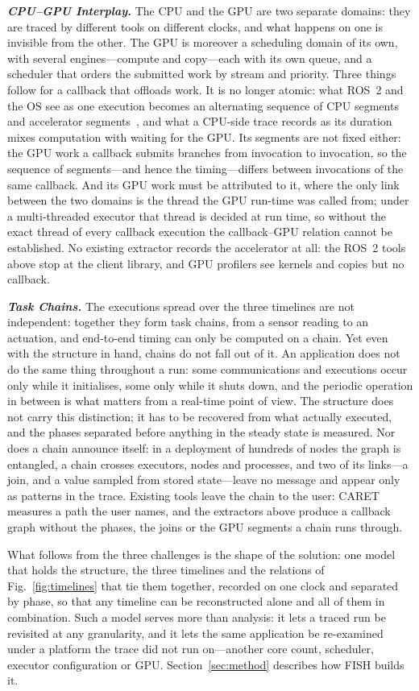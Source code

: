 \noindent
\textit{\textbf{CPU--GPU Interplay.}}
The CPU and the GPU are two separate domains: they are traced by different tools on different clocks, and what happens on one is invisible from the other. The GPU is moreover a scheduling domain of its own, with several engines---compute and copy---each with its own queue, and a scheduler that orders the submitted work by stream and priority. Three things follow for a callback that offloads work. It is no longer atomic: what ROS~2 and the OS see as one execution becomes an alternating sequence of CPU segments and accelerator segments~\cite{enright-2024-paam}, and what a CPU-side trace records as its duration mixes computation with waiting for the GPU. Its segments are not fixed either: the GPU work a callback submits branches from invocation to invocation, so the sequence of segments---and hence the timing---differs between invocations of the same callback. And its GPU work must be attributed to it, where the only link between the two domains is the thread the GPU run-time was called from; under a multi-threaded executor that thread is decided at run time, so without the exact thread of every callback execution the callback--GPU relation cannot be established. No existing extractor records the accelerator at all: the ROS~2 tools above stop at the client library, and GPU profilers see kernels and copies but no callback.

\noindent
\textit{\textbf{Task Chains.}}
The executions spread over the three timelines are not independent: together they form task chains, from a sensor reading to an actuation, and end-to-end timing can only be computed on a chain. Yet even with the structure in hand, chains do not fall out of it. An application does not do the same thing throughout a run: some communications and executions occur only while it initialises, some only while it shuts down, and the periodic operation in between is what matters from a real-time point of view. The structure does not carry this distinction; it has to be recovered from what actually executed, and the phases separated before anything in the steady state is measured. Nor does a chain announce itself: in a deployment of hundreds of nodes the graph is entangled, a chain crosses executors, nodes and processes, and two of its links---a join, and a value sampled from stored state---leave no message and appear only as patterns in the trace. Existing tools leave the chain to the user: CARET measures a path the user names, and the extractors above produce a callback graph without the phases, the joins or the GPU segments a chain runs through.

What follows from the three challenges is the shape of the solution: one model that holds the structure, the three timelines and the relations of Fig.~\ref{fig:timelines} that tie them together, recorded on one clock and separated by phase, so that any timeline can be reconstructed alone and all of them in combination. Such a model serves more than analysis: it lets a traced run be revisited at any granularity, and it lets the same application be re-examined under a platform the trace did not run on---another core count, scheduler, executor configuration or GPU. Section~\ref{sec:method} describes how FISH builds it.
